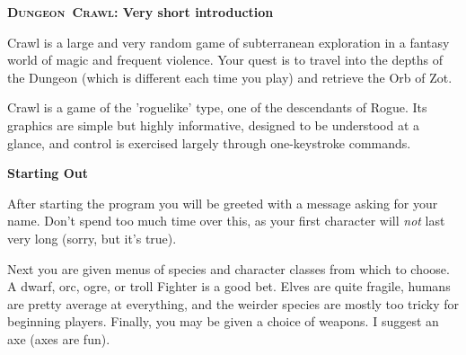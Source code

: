 \documentclass[a4paper,10pt]{article}
\newcommand{\sex}[1]{{{\textbf{#1}}}} %
\newcommand{\crawl}{\textsc{Crawl}}
\newcommand{\dungeon}{\textsc{Dungeon}}
\newcommand{\para}{\vspace{1.5ex}}
\begin{document}
\begin{center}\textbf{\LARGE
\dungeon\ \crawl: Very short introduction}
\end{center}

Crawl is a large and very random game of subterranean exploration in a fantasy 
world of magic and frequent violence. Your quest is to travel into the depths 
of the Dungeon (which is different each time you play) and retrieve the Orb of 
Zot. 

\para

Crawl is a game of the 'roguelike' type, one of the descendants of Rogue. Its 
graphics are simple but highly informative, designed to be understood at a 
glance, and control is exercised largely through one-keystroke commands. 

\para\para

\sex{Starting Out} \para

After starting the program you will be greeted with a message asking for your 
name. Don't spend too much time over this, as your first character will 
\emph{not} last very long (sorry, but it's true). 

\para

Next you are given menus of species and character classes from which to 
choose. A dwarf, orc, ogre, or troll Fighter is a good bet. Elves are quite 
fragile, humans are pretty average at everything, and the weirder species are 
mostly too tricky for beginning players. Finally, you may be given a choice of 
weapons. I suggest an axe (axes are fun). 

\para
\end{document}
